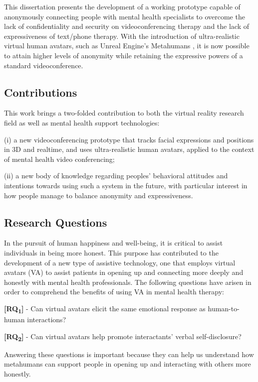 This dissertation presents the development of a working prototype capable of anonymously connecting people with mental health specialists to overcome the lack of confidentiality and security on videoconferencing therapy and the lack of expressiveness of text/phone therapy. With the introduction of ultra-realistic virtual human avatars, such as Unreal Engine's Metahumans \cite{EPI21, FAN21}, it is now possible to attain higher levels of anonymity while retaining the expressive powers of a standard videoconference.

\subsection{Contributions}
This work brings a two-folded contribution to both the virtual reality research field as well as mental health support technologies:

(i) a new videoconferencing prototype that tracks facial expressions and positions in 3D and realtime, and uses ultra-realistic human avatars, applied to the context of mental health video conferencing;

(ii) a new body of knowledge regarding peoples’ behavioral attitudes and intentions towards using such a system in the future, with particular interest in how people manage to balance anonymity and expressiveness.

\subsection{Research Questions}
In the pursuit of human happiness and well-being, it is critical to assist individuals in being more honest. This purpose has contributed to the development of a new type of assistive technology, one that employs virtual avatars (VA) to assist patients in opening up and connecting more deeply and honestly with mental health professionals. The following questions have arisen in order to comprehend the benefits of using VA in mental health therapy:

\textbf{[RQ\textsubscript{1}]} - Can virtual avatars elicit the same emotional response as human-to-human interactions?

\textbf{[RQ\textsubscript{2}]} - Can virtual avatars help promote interactants' verbal self-disclosure?

Answering these questions is important because they can help us understand how metahumans can support people in opening up and interacting with others more honestly.

